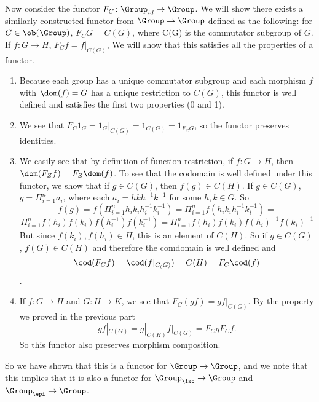\documentclass[main.tex]{subfiles}
\begin{document}
Now consider the functor $F_C\colon  \Group_{id} \rightarrow \Group$. We will show
there exists a similarly constructed functor from $\Group \rightarrow \Group$
defined as the following: for $G \in \ob(\Group)$, $F_CG = C(G)$, where C(G) is
the commutator subgroup of $G$. If $f \colon G \rightarrow H$, $F_Cf = f|_{C(G)}$, We
will show that this satisfies all the properties of a functor.
\begin{enumerate}
	\item Because each group has a unique commutator subgroup and each morphism
		$f$ with $\dom(f) = G$ has a unique restriction to $C(G)$, this functor
		is well defined and satisfies the first two properties (0 and 1).

	\item We see that $F_{C} 1_{G} = 1_{G}|_{C(G)} = 1_{C(G)} = 1_{F_{C}G}$, so
		the functor preserves identities.

	\item We easily see that by definition of function restriction, if $f\colon G
		\rightarrow H$, then $\dom(F_{Z}f) = F_{Z}\dom(f)$. To see that the
		codomain is well defined under this functor, we show that if $g \in
		C(G)$, then $f(g) \in C(H)$. If $g \in C(G)$, $g = \Pi_{i = 1}^{n} a_i$,
		where each $a_i = hkh^{-1}k^{-1}$ for some $h,k \in G$. So $$f(g) =
		f(\Pi_{i = 1}^{n} h_ik_ih_i^{-1}k_i^{-1}) = \Pi_{i = 1}^{n}
		f(h_ik_ih_i^{-1}k_i^{-1}) =$$ $$  \Pi_{i = 1}^{n}
		f(h_i)f(k_i)f(h_i^{-1})f(k_i^{-1}) = \Pi_{i = 1}^{n}
		f(h_i)f(k_i)f(h_i)^{-1}f(k_i)^{-1}$$ But since $f(k_i), f(h_i) \in H$,
		this is an element of $C(H)$. So if $g \in C(G)$, $f(G) \in C(H)$ and
		therefore the comdomain is well defined and  \[\cod(F_{C}f) =
		\cod(f|_{C_(G)}) = C(H) = F_{C}\cod(f)\].

	\item If $f\colon G \rightarrow H$ and $G\colon H \rightarrow K$, we see that $F_C(gf)
		= gf|_{C(G)}$. By the property we proved in the previous part
		\[gf|_{C(G)} = g|_{C(H)}f|_{C(G)} = F_CgF_Cf.\] So this functor also
		preserves morphism composition.
\end{enumerate}

So we have shown that this is a functor for $\Group \rightarrow \Group$, and we
note that this implies that it is also a functor for $\Group_\iso \rightarrow
\Group$ and $\Group _\epi \rightarrow \Group$.
\end{document}

